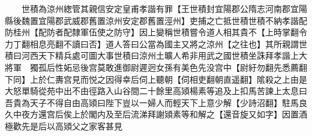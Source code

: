 　　世積為涼州緫管其親信安定皇甫孝諧有罪【王世積封宜陽郡公隋志河南郡宜陽縣後魏置宜陽郡武威郡舊置涼州安定郡舊置涇州】吏捕之亡抵世積世積不納孝諧配防桂州【配防者配隸軍伍使之防守】因上變稱世積嘗令道人相其貴不【上時掌翻令力丁翻相息亮翻不讀曰否】道人答曰公當為國主又將之涼州【之往也】其所親謂世積曰河西天下精兵處可圖大事世積曰涼州土曠人希非用武之國世積坐誅拜孝諧上大將軍　獨孤后性妬忌後宫莫敢進御尉遲迥女孫有美色先没宫中【尉紆勿翻先悉薦翻下同】上於仁夀宫見而悦之因得幸后伺上聽朝【伺相吏翻朝直遥翻】隂殺之上由是大怒單騎從苑中出不由徑路入山谷間二十餘里高熲楊素等追及上扣馬苦諫上太息曰吾貴為天子不得自由高熲曰陛下豈以一婦人而輕天下上意少解【少詩沼翻】駐馬良久中夜方還宫后俟上於閣内及至后流涕拜謝熲素等和解之【還音旋又如字】因置酒極歡先是后以高熲父之家客甚見
